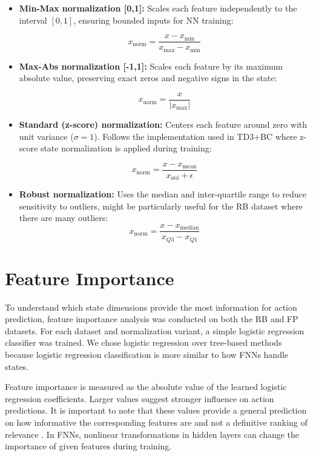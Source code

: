 \begin{itemize}
    \item \textbf{Min-Max normalization [0,1]:} Scales each feature independently to the interval $[0,1]$, ensuring bounded inputs for NN training:
    
    $$x_\text{norm} = \frac{x - x_\text{min}}{x_\text{max} - x_\text{min}}$$
    

    \item \textbf{Max-Abs normalization [-1,1]:} Scales each feature by its maximum absolute value, preserving exact zeros and negative signs in the state:
    
    $$x_\text{norm} = \frac{x}{|x_\text{max}|}$$
    

    \item \textbf{Standard (z-score) normalization:} Centers each feature around zero with unit variance ($\sigma = 1$). Follows the implementation used in TD3+BC \cite{fujimoto2021minimalist} where z-score state normalization is applied during training:

    $$x_\text{norm} = \frac{x - x_\text{mean}}{x_\text{std} + \epsilon}$$


    \item \textbf{Robust normalization:} Uses the median and inter-quartile range to reduce sensitivity to outliers, might be particularly useful for the RB dataset where there are many outliers:
    $$x_\text{norm} = \frac{x - x_\text{median}}{x_{Q3} - x_{Q1}}$$
\end{itemize}






\section{Feature Importance}





To understand which state dimensions provide the most information for action prediction, feature importance analysis was conducted on both the RB and FP datasets. For each dataset and normalization variant, a simple logistic regression classifier was trained. We chose logistic regression over tree-based methods because logistic regression classification is more similar to how FNNs handle states.

Feature importance is measured as the absolute value of the learned logistic regression coefficients. Larger values suggest stronger influence on action predictions. It is important to note that these values provide a general prediction on how informative the corresponding features are and not a definitive ranking of relevance \cite{hooker2019benchmark}. In FNNs, nonlinear transformations in hidden layers can change the importance of given features during training.



